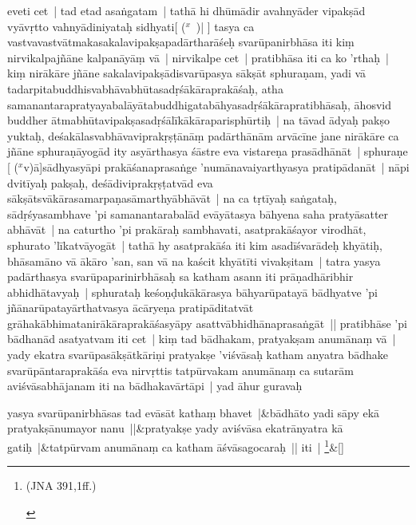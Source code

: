 \documentclass[article,12pt,a4paper]{memoir}
\newcommand{\corr}[1]{($^{x}$#1)}
\begin{document}
eveti cet | tad etad asaṅgatam | tathā hi dhūmādir avahnyāder vipakṣād vyāvṛtto vahnyādiniyataḥ sidhyati[ {\corr  | }] tasya ca vastvavastvātmakasakalavipakṣapadārtharāśeḥ svarūpanirbhāsa iti kiṃ nirvikalpajñāne kalpanāyāṃ vā | nirvikalpe cet | pratibhāsa iti ca ko 'rthaḥ | kiṃ nirākāre jñāne sakalavipakṣādisvarūpasya sākṣāt sphuraṇam, yadi vā tadarpitabuddhisvabhāvabhūtasadṛśākāraprakāśaḥ, atha samanantarapratyayabalāyātabuddhigatabāhyasadṛśākārapratibhāsaḥ, āhosvid buddher ātmabhūtavipakṣasadṛśālīkākāraparisphūrtiḥ | \label{thakur75-131.24} na tāvad ādyaḥ pakṣo yuktaḥ, deśakā\label{capv-np-4a-end}\label{capv-np-4b-start}lasvabhāvaviprakṛṣṭānāṃ padārthānām arvācīne jane nirākāre ca jñāne sphuraṇāyogād ity asyārthasya śāstre eva vistareṇa prasādhānāt | sphuraṇe [ {\corr vā}]sādhyasyāpi prakāśanaprasaṅge 'numānavaiyarthyasya pratipādanāt | \label{thakur75-131.27} nāpi dvitīyaḥ pakṣaḥ, deśādiviprakṛṣṭatvād eva sākṣātsvākārasamarpaṇasāmarthyābhāvāt | \label{thakur75-131.29} na ca tṛtīyaḥ saṅgataḥ, sādṛśyasambhave 'pi samanantarabalād evāyātasya bāhyena saha pratyāsatter abhāvāt | \label{thakur75-131.31} na caturtho 'pi prakāraḥ sambhavati, asatprakāśayor virodhāt, sphurato 'līkatvāyogāt | tathā hy asatprakāśa iti kim asadīśvarādeḥ khyātiḥ, bhāsamāno vā ākāro 'san, san vā na kaścit khyātīti vivakṣitam | tatra yasya padārthasya svarūpaparinirbhāsaḥ sa katham asann iti prāṇadhāribhir abhidhātavyaḥ | sphurataḥ keśoṇḍukākārasya bāhyarūpatayā bādhyatve 'pi jñānarūpatayārthatvasya ācāryeṇa pratipāditatvāt grāhakābhimatanirākāraprakāśasyāpy asattvābhidhānaprasaṅgāt || \label{thakur75-132.3} pratibhāse 'pi bādhanād asatyatvam iti cet | kiṃ tad bādhakam, pratyakṣam anumānaṃ vā | yady ekatra svarūpasā\label{capv-np-4b-end}kṣātkāriṇi pratyakṣe 'viśvāsaḥ katham anyatra bādhake svarūpāntaraprakāśa eva nirvṛttis tatpūrvakam anumānaṃ ca sutarām aviśvāsabhājanam iti na bādhakavārtāpi | yad āhur guravaḥ
	\pend
      
	    
	    \stanza[\smallbreak]
	yasya svarūpanirbhāsas tad evāsāt kathaṃ bhavet |&bādhāto yadi sāpy ekā pratyakṣānumayor nanu ||&pratyakṣe yady aviśvāsa ekatrānyatra kā gatiḥ |&tatpūrvam anumānaṃ ca katham āśvāsagocaraḥ || iti | \footnote{\begin{english}(JNA 391,1ff.)\end{english}}\&[\smallbreak]
\end{document}

